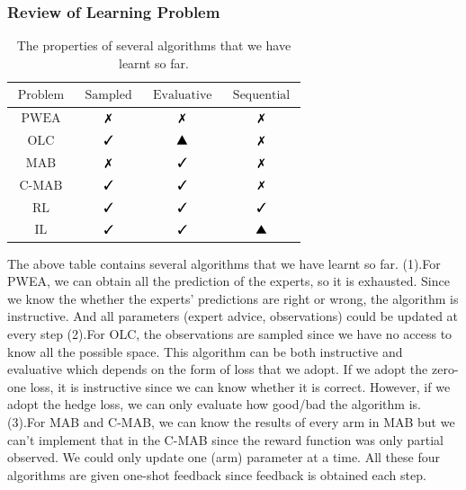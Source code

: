 \documentclass[11pt]{article}
\newcommand{\xmark}{\text{\ding{55}}}
\newcommand{\cmark}{\text{\ding{51}}}
\newcommand{\tri}{\text{\ding{115}}}
\begin{document}
\subsubsection{Review of Learning Problem}

\begin{table}[h!]
    \centering
    \begin{tabular}{|c|c|c|c|}
        \hline $\text { Problem }$ &  $\text { Sampled }$ & $\text { Evaluative }$ & $\text { Sequential }$ \\
        \hline $\text { PWEA }$ &     $\xmark$ & $\xmark$ & $\xmark$ \\
        \hline $\text { OLC }$ &      $\cmark$ & $\tri$ & $\xmark$ \\
        \hline $\text { MAB }$ &      $\xmark$ &        $\cmark$ & $\xmark$ \\
        \hline $\text { C-MAB }$ &    $\cmark$ & $\cmark$ & $\xmark$ \\
        \hline $\text { RL }$ &      $\cmark$ & $\cmark$ & $\cmark$ \\
        \hline $\text { IL }$ &      $\cmark$ & $\cmark$ & $\tri$ \\
        \hline
    \end{tabular}
    \caption{The properties of several algorithms that we have learnt so far.}
    \label{tab:my_label}
\end{table}

The above table contains several algorithms that we have learnt so far. (1).For PWEA, we can obtain all the prediction of the experts, so it is exhausted. Since we know the whether the experts' predictions are right or wrong, the algorithm is instructive. And all parameters (expert advice, observations) could be updated at every step (2).For OLC, the observations are sampled since we have no access to know all the possible space. This algorithm can be both instructive and evaluative which depends on the form of loss that we adopt. If we adopt the zero-one loss, it is instructive since we can know whether it is correct. However, if we adopt the hedge loss, we can only evaluate how good/bad the algorithm is. (3).For MAB and C-MAB, we can know the results of every arm in MAB but we can't implement that in the C-MAB since the reward function was only partial observed.
We could only update one (arm) parameter at a time. All these four algorithms are given one-shot feedback since feedback is obtained each step.

\end{document}
